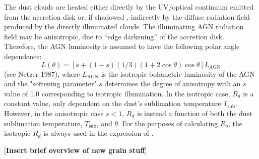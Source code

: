 \par The dust clouds are heated either directly by the UV/optical continuum emitted from the accretion disk or, if shadowed , indirectly by the diffuse radiation field produced by the directly illuminated clouds. The illuminating AGN radiation field may be anisotropic, due to “edge darkening” of the accretion disk. Therefore, the AGN luminosity is assumed to have the following polar angle dependence:
$$L(\theta) = \left[s + (1 - s)(1/3)(1 + 2 \cos{\theta})\cos{\theta}\right]L_{\text{AGN}}$$
(see Netzer 1987), where $L_{\text{AGN}}$ is the isotropic bolometric luminosity of the AGN and the "softening parameter" $s$ determines the degree of anisotropy with an $s$ value of 1.0 corresponding to isotropic illumination. In the isotropic case, $R_d$ is a constant value, only dependent on the dust's sublimation temperature $T_{\text{sub}}$. However, in the anisotropic case $s < 1$, $R_d$ is instead a function of both the dust sublimation temperature, $T_{\text{sub}}$, and $\theta$. For the purposes of calculating $R_o$, the isotropic $R_d$ is always used in the expression of \Y.

[{\bf Insert brief overview of new grain stuff}]  

